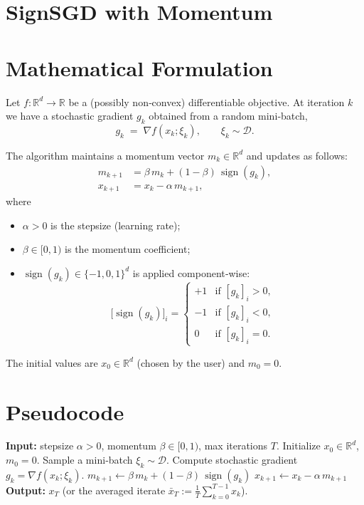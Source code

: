 \documentclass{article}
\newcommand{\sign}{\operatorname{sign}}
\newcommand{\R}{\mathbb{R}}
\begin{document}
\section*{SignSGD with Momentum}

\section*{Mathematical Formulation}
Let $f:\R^{d}\rightarrow\R$ be a (possibly non‑convex) differentiable objective.  
At iteration $k$ we have a stochastic gradient $g_{k}$ obtained from a random mini‑batch,
\[
g_{k}\;=\;\nabla f(x_{k};\xi_{k}),\qquad \xi_{k}\sim\mathcal{D}.
\]

The algorithm maintains a momentum vector $m_{k}\in\R^{d}$ and updates as follows:
\begin{align}
m_{k+1} &= \beta\, m_{k} + (1-\beta)\,\sign(g_{k}) , \label{eq:momentum}\\[4pt]
x_{k+1} &= x_{k} - \alpha \, m_{k+1}, \label{eq:update}
\end{align}
where
\begin{itemize}
  \item $\alpha>0$ is the stepsize (learning rate);
  \item $\beta\in[0,1)$ is the momentum coefficient;
  \item $\sign(g_{k})\in\{-1,0,1\}^{d}$ is applied component‑wise:
  \[
  \big[\sign(g_{k})\big]_{i}= 
  \begin{cases}
  +1 & \text{if }[g_{k}]_{i}>0,\\
  -1 & \text{if }[g_{k}]_{i}<0,\\
   0 & \text{if }[g_{k}]_{i}=0.
  \end{cases}
  \]
\end{itemize}
The initial values are $x_{0}\in\R^{d}$ (chosen by the user) and $m_{0}=0$.

\section*{Pseudocode}
\begin{algorithm}[H]
\caption{SignSGD with Momentum}
\begin{algorithmic}[1]
\State \textbf{Input:} stepsize $\alpha>0$, momentum $\beta\in[0,1)$, max iterations $T$.
\State Initialize $x_{0}\in\R^{d}$, $m_{0}=0$.
    \State Sample a mini‑batch $\xi_{k}\sim\mathcal{D}$.
    \State Compute stochastic gradient $g_{k}= \nabla f(x_{k};\xi_{k})$.
    \State $m_{k+1}\gets \beta\,m_{k}+(1-\beta)\,\sign(g_{k})$ \hfill{}
    \State $x_{k+1}\gets x_{k}-\alpha\,m_{k+1}$ \hfill{}
\EndFor
\State \textbf{Output:} $x_{T}$ (or the averaged iterate $\bar x_{T}:=\frac1T\sum_{k=0}^{T-1}x_{k}$).
\end{algorithmic}
\end{algorithm}
\end{document}
